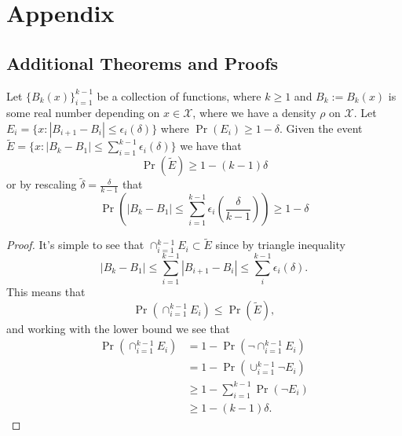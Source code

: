 
\chapter{Appendix}

\section{Additional Theorems and Proofs}
\label{sec:appendix-proofs}

\begin{lemma}
  \label{lem:combining_slt_bounds}
  Let \(\{B_k(x)\}_{i=1}^{k-1}\) be a collection of functions, where \(k \geq 1\) and \(B_k := B_k(x)\) is
  some real number depending on \(x \in \mathcal{X}\), where we have a density
  \(\rho\) on \(\mathcal{X}\). Let \(E_i = \{x : |B_{i+1} - B_{i}| \leq
  \epsilon_i(\delta)\}\) where \(\Pr(E_i) \geq 1 - \delta\). Given the event
  \(\tilde{E} = \{x : |B_{k} - B_{1}| \leq \sum_{i=1}^{k-1}\epsilon_i(\delta)\}\) we
  have that
  \begin{equation}
    \Pr(\tilde{E}) \geq 1 - (k-1) \delta
  \end{equation}
  or by rescaling \(\tilde{\delta} = \frac{\delta}{k-1}\) that
  \begin{equation}
    \Pr(|B_{k} - B_1| \leq \sum_{i=1}^{k-1}\epsilon_i(\frac{\delta}{k-1})) \geq 1 - \delta
  \end{equation}
\end{lemma}
\begin{proof}
  It's simple to see that \(\cap_{i=1}^{k-1}E_i \subset \tilde{E}\) since by
  triangle inequality
  \begin{equation*}
    |B_{k} - B_1| \leq \sum_{i=1}^{k-1}|B_{i+1} - B_i| \leq \sum_i^{k-1} \epsilon_i(\delta).
  \end{equation*}
  This means that
  \begin{equation*}
    \Pr(\cap_{i=1}^{k-1}E_i) \leq \Pr(\tilde{E}),
  \end{equation*}
  and working with the lower bound we see that
  \begin{align*}
    \Pr(\cap_{i=1}^{k-1}E_i) & = 1 - \Pr(\neg \cap_{i=1}^{k-1}E_i) \\
                                    & = 1 - \Pr(\cup_{i=1}^{k-1} \neg E_i) \\
                                    & \geq 1 - \sum_{i=1}^{k-1} \Pr(\neg E_i) \\
                                    & \geq 1 - (k-1)\delta.
  \end{align*}
\end{proof}


